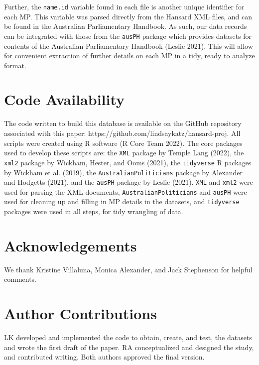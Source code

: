 \documentclass[
  letterpaper,
  DIV=11,
  numbers=noendperiod]{scrartcl}
\begin{document}
Further, the \texttt{name.id} variable found in each file is another
unique identifier for each MP. This variable was parsed directly from
the Hansard XML files, and can be found in the Australian Parliamentary
Handbook. As such, our data records can be integrated with those from
the \texttt{ausPH} package which provides datasets for contents of the
Australian Parliamentary Handbook (Leslie 2021). This will allow for
convenient extraction of further details on each MP in a tidy, ready to
analyze format.

\hypertarget{code-availability}{%
\section{Code Availability}\label{code-availability}}

The code written to build this database is available on the GitHub
repository associated with this paper:
https://github.com/lindsaykatz/hansard-proj. All scripts were created
using R software (R Core Team 2022). The core packages used to develop
these scripts are: the \texttt{XML} package by Temple Lang (2022), the
\texttt{xml2} package by Wickham, Hester, and Ooms (2021), the
\texttt{tidyverse} R packages by Wickham et al. (2019), the
\texttt{AustralianPoliticians} package by Alexander and Hodgetts (2021),
and the \texttt{ausPH} package by Leslie (2021). \texttt{XML} and
\texttt{xml2} were used for parsing the XML documents,
\texttt{AustralianPoliticians} and \texttt{ausPH} were used for cleaning
up and filling in MP details in the datasets, and \texttt{tidyverse}
packages were used in all steps, for tidy wrangling of data.

\hypertarget{acknowledgements}{%
\section{Acknowledgements}\label{acknowledgements}}

We thank Kristine Villaluna, Monica Alexander, and Jack Stephenson for
helpful comments.

\hypertarget{author-contributions}{%
\section{Author Contributions}\label{author-contributions}}

LK developed and implemented the code to obtain, create, and test, the
datasets and wrote the first draft of the paper. RA conceptualized and
designed the study, and contributed writing. Both authors approved the
final version.
\end{document}
